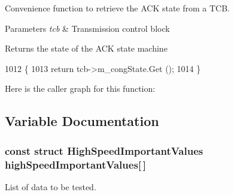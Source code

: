 Convenience function to retrieve the A\+CK state from a T\+CB. 


\begin{DoxyParams}{Parameters}
{\em tcb} & Transmission control block \\
\hline
\end{DoxyParams}
\begin{DoxyReturn}{Returns}
the state of the A\+CK state machine 
\end{DoxyReturn}

\begin{DoxyCode}
1012 \{
1013   \textcolor{keywordflow}{return} tcb->m\_congState.Get ();
1014 \}
\end{DoxyCode}


Here is the caller graph for this function\+:




\subsection{Variable Documentation}
\subsubsection[{\texorpdfstring{high\+Speed\+Important\+Values}{highSpeedImportantValues}}]{\setlength{\rightskip}{0pt plus 5cm}const struct {\bf High\+Speed\+Important\+Values}  high\+Speed\+Important\+Values\mbox{[}$\,$\mbox{]}\hspace{0.3cm}{\ttfamily [static]}}\hypertarget{group__internet-test_gae438c206bcae7bc361b00919b5038a18}{}\label{group__internet-test_gae438c206bcae7bc361b00919b5038a18}


List of data to be tested. 

